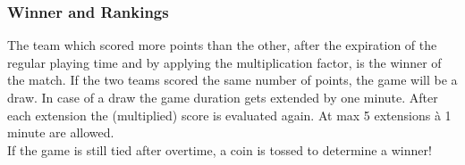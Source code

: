 \subsubsection{Winner and Rankings}
\label{sec:rankings}

The team which scored more points than the other, after the expiration of the regular playing time and by applying the multiplication factor, is the winner of the match. If the two teams scored the same number of points, the game will be a draw. In case of a draw the game duration gets extended by one minute. After each extension the (multiplied) score is evaluated again. At max 5 extensions à 1 minute are allowed. \\
If the game is still tied after overtime, a coin is tossed to determine a winner!    
